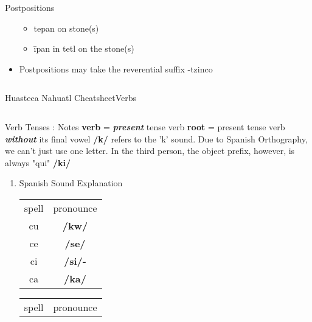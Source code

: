 \documentclass[12pt]{beamer}
\newcommand{\nah}[1]{\textcolor{nahgrn}{#1}}
\newcommand{\trs}[1]{\textcolor{nahblu}{#1}}
\begin{document}
\begin{frame}
\begin{columns}[t]
\begin{column}{.20\linewidth}
\begin{block}{Postpositions}
\begin{itemize}
                \begin{itemize}
                  \item \nah{tepan} \trs{on stone(s)}
                  \item \nah{īpan in tetl} \trs{on the stone(s)}
                \end{itemize}
          \item Postpositions may take the reverential suffix \nah{-tzinco}
        \end{itemize}
      \end{block}
    \end{column}
  \end{columns}
\end{frame}


\begin{frame}%
	{Huasteca Nahuatl Cheatsheet}{Verbs}
	\begin{columns}[t]
		\begin{column}{.26\linewidth}
			\begin{block}{Verb Tenses : Notes}
				\textbf{verb} = \textbf{\textit{present}} tense verb \newline
				\textbf{root} = present tense verb \textbf{\textit{without}} its final vowel \newline
				\newline
				\textbf{/k/} refers to the 'k' sound. Due to Spanish Orthography, we can't just use one letter. \newline
				In the third person, the object prefix, however, is always "qui" \textbf{/ki/} \newline
				\begin{enumerate}
					\item Spanish Sound Explanation \newline
					\begin{tabular}[t]{c|c|}
						spell & pronounce \\
						\cline{1-2}
						cu & \textbf{/kw/} 	\\
						ce & \textbf{/se/} 	\\
						ci & \textbf{/si/-} \\
						ca & \textbf{/ka/} 	\\
					\end{tabular}%
					\begin{tabular}[t]{c|c}
						spell & pronounce \\

\end{tabular}
\end{enumerate}
\end{block}
\end{column}
\end{columns}
\end{frame}
\end{document}

